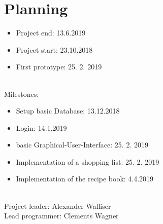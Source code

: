 \documentclass[12pt]{article}
\theoremstyle{definition}
\newenvironment{textblock}{%
   \setlength{\parindent}{0pt}
   \large
   
}{}
\begin{document}
\pagebreak

\section{Planning}

\begin{textblock}
\begin{itemize}
\item Project end: 13.6.2019
\item Project start: 23.10.2018
\item First prototype: 25. 2. 2019 \\\\
\end{itemize}

Milestones:
\begin{itemize}
\item Setup basic Database: 13.12.2018
\item Login: 14.1.2019
\item basic Graphical-User-Interface: 25. 2. 2019
\item Implementation of a shopping list: 25. 2. 2019
\item Implementation of the recipe book: 4.4.2019 \\\\
\end{itemize}


Project leader: Alexander Walliser \\
Lead programmer: Clements Wagner

\end{textblock}
\end{document}
